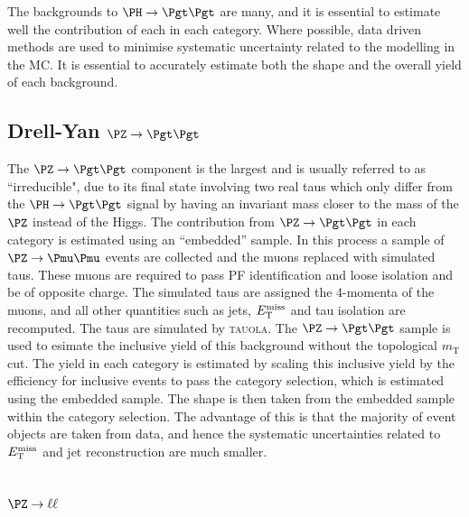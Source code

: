 The backgrounds to $\HToTauTau$ are many, and it is essential to estimate well
the contribution of each in each category. Where possible, data driven methods
are used to minimise systematic uncertainty related to the modelling in the
\ac{MC}. It is essential to accurately estimate both the shape and the overall
yield of each background.

\subsection{Drell-Yan $\PZ \to\Pgt\Pgt$}
\label{sec:backgroundEstimation_Ztautau}

The $\PZ \to \Pgt\Pgt$ component is the largest and is usually referred to as ``irreducible", due to its final
state involving two real taus which only differ from the $\PH \to \Pgt\Pgt$ signal by
having an invariant mass closer to the mass of the $\PZ$ instead of the Higgs.
The contribution from $\ZToTauTau$ in each category is estimated using an
``embedded'' sample. In this process a sample of $\PZ\to\Pmu\Pmu$ events are
collected and the muons replaced with simulated taus. These muons are required
to pass \ac{PF} identification and loose isolation and be of opposite charge.
The simulated taus are assigned the 4-momenta of the muons, and all other
quantities such as jets, $E_{\mathrm{T}}^{\text{miss}}$ and tau isolation are recomputed. The taus
are simulated by \textsc{tauola}. The $\ZToTauTau$ sample is used to esimate 
the inclusive yield of this background without the topological $m_{\text{T}}$
cut. 
The yield in each category is estimated by scaling this inclusive yield by the efficiency for 
inclusive events to pass the category selection, which is estimated using the
embedded sample. The shape is then taken from the embedded sample within the
category selection. The advantage of this is that the majority of event objects
are taken from data, and hence the systematic uncertainties related to $E_{\mathrm{T}}^{\text{miss}}$
and jet reconstruction are much smaller. 


\subsection{$\PZ\to\ell\ell$}
\label{sec:backgroundEstimation_Zll}


